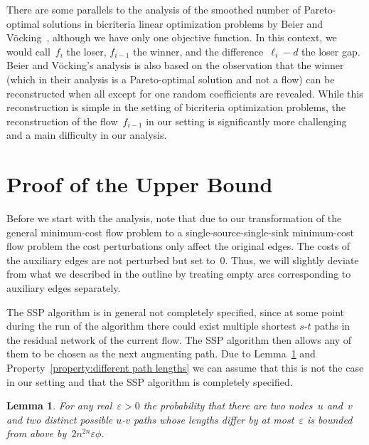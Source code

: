 \documentclass[11pt]{article}
\newtheorem{lemma}[theorem]{Lemma}
\newcommand{\e}{\varepsilon}
\begin{document}
There are some parallels to the analysis of the smoothed number of Pareto-optimal solutions in bicriteria linear optimization problems by Beier and V\"ocking~\cite{DBLP:journals/siamcomp/BeierV06}, although we have only one objective function.
In this context, we would call~$f_i$ the loser, $f_{i-1}$ the winner, and the difference~$\ell_i - d$ the loser gap. Beier and V\"ocking's analysis is also based on the observation
that the winner (which in their analysis is a Pareto-optimal solution and not a flow) can be reconstructed when all except for one random coefficients are revealed.
While this reconstruction is simple in the setting of bicriteria optimization problems, the reconstruction of the flow~$f_{i-1}$  in our setting is significantly more challenging and a main
difficulty in our analysis.

\section{Proof of the Upper Bound}
\label{sec:analysis}

Before we start with the analysis, note that due to our transformation of the general minimum-cost flow problem to a single-source-single-sink minimum-cost flow problem the cost perturbations only affect the original edges. The costs of the auxiliary edges are not perturbed but set to~$0$. Thus, we will slightly deviate from what we described in the outline by treating empty arcs corresponding to auxiliary edges separately.

The SSP algorithm is in general not completely specified, since at some point during the run of the algorithm there could exist multiple shortest $s$-$t$ paths in the residual network of the current flow.
The SSP algorithm then allows any of them to be chosen as the next augmenting path. Due to Lemma~\ref{lemma:different path lengths} and Property~\ref{property:different path lengths} we can assume that this is not the case in our setting and that the SSP algorithm is completely specified.

\begin{lemma}
\label{lemma:different path lengths}
For any real~$\e > 0$ the probability that there are two nodes~$u$ and~$v$ and two distinct possible $u$-$v$ paths whose lengths differ by at most~$\e$ is bounded from above by~$2n^{2n} \e \phi$.
\end{lemma}
\end{document}
